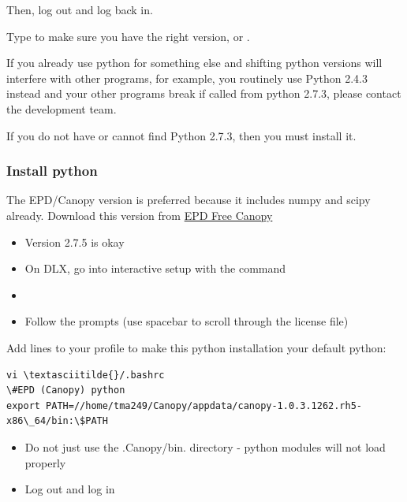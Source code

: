 \documentclass[letterpaper,10pt,english]{sphinxmanual}
\begin{document}
Then, log out and log back in.

Type  to make sure you have the right version, or .

If you already use python for something else and shifting python versions will interfere with other programs, for example, you routinely use Python 2.4.3 instead and your other programs break if called from python 2.7.3, please contact the development team.

If you do not have or cannot find Python 2.7.3, then you must install it.


\subsubsection{Install python}
\label{1_0_installation:install-python}
The EPD/Canopy version is preferred because it includes numpy and scipy already. Download this version from \href{https://www.enthought.com/downloads/}{EPD Free Canopy}
\begin{itemize}
\item {} 
Version 2.7.5 is okay

\item {} 
On DLX, go into interactive setup with the command 

\item {} 

\item {} 
Follow the prompts (use spacebar to scroll through the license file)

\end{itemize}

Add lines to your profile to make this python installation your default python:

\begin{Verbatim}[commandchars=\\\{\}]
vi \textasciitilde{}/.bashrc
\#EPD (Canopy) python
export PATH=//home/tma249/Canopy/appdata/canopy-1.0.3.1262.rh5-x86\_64/bin:\$PATH
\end{Verbatim}
\begin{itemize}
\item {} 
Do not just use the .Canopy/bin. directory - python modules will not load properly

\item {} 
Log out and log in

\end{itemize}
\end{document}
